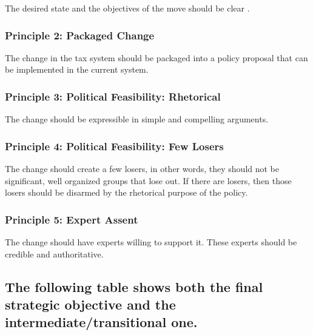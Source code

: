 \documentclass[]{tufte-handout}
\begin{document}
The desired state and the objectives of the move should be clear .

\hypertarget{principle-2-packaged-change}{%
\subsubsection{Principle 2: Packaged
Change}\label{principle-2-packaged-change}}

The change in the tax system should be packaged into a policy proposal
that can be implemented in the current system.

\hypertarget{principle-3-political-feasibility-rhetorical}{%
\subsubsection{Principle 3: Political Feasibility:
Rhetorical}\label{principle-3-political-feasibility-rhetorical}}

The change should be expressible in simple and compelling arguments.

\hypertarget{principle-4-political-feasibility-few-losers}{%
\subsubsection{Principle 4: Political Feasibility: Few
Losers}\label{principle-4-political-feasibility-few-losers}}

The change should create a few losers, in other words, they should not
be significant, well organized groups that lose out. If there are
losers, then those losers should be disarmed by the rhetorical purpose
of the policy.

\hypertarget{principle-5-expert-assent}{%
\subsubsection{Principle 5: Expert
Assent}\label{principle-5-expert-assent}}

The change should have experts willing to support it. These experts
should be credible and authoritative.

\hypertarget{the-following-table-shows-both-the-final-strategic-objective-and-the-intermediatetransitional-one.}{%
\subsection{The following table shows both the final strategic objective
and the intermediate/transitional
one.}\label{the-following-table-shows-both-the-final-strategic-objective-and-the-intermediatetransitional-one.}}
\end{document}
